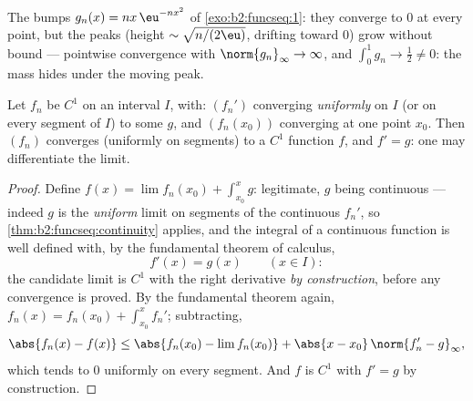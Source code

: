 \begin{omfigure}

{\small The bumps $g_n(x) = nx\,\eu^{-nx^2}$ of
\cref{exo:b2:funcseq:1}: they converge to $0$ at every point,
but the peaks (height $\sim\sqrt{n/(2\eu)}$, drifting toward
$0$) grow without bound --- pointwise convergence with
$\norm{g_n}_\infty \to \infty$, and $\int_0^1 g_n \to \frac12
\neq 0$: the mass hides under the moving peak.}
\end{omfigure}

\begin{theorem}[Differentiation]\label{thm:b2:funcseq:differentiation}
Let $f_n$ be $C^1$ on an interval $I$, with: $(f_n')$ converging
\emph{uniformly} on $I$ (or on every segment of $I$) to some $g$,
and $(f_n(x_0))$ converging at one point $x_0$. Then $(f_n)$
converges (uniformly on segments) to a $C^1$ function $f$, and $f'
= g$: one may differentiate the limit.
\end{theorem}

\begin{proof}
Define $f(x) = \lim f_n(x_0) + \int_{x_0}^x g$: legitimate, $g$
being continuous --- indeed $g$ is the \emph{uniform} limit on
segments of the continuous $f_n'$, so
\cref{thm:b2:funcseq:continuity} applies, and the integral of
a continuous function is well defined with, by the fundamental
theorem of calculus,
\[
f'(x) = g(x) \qquad (x \in I) :
\]
the candidate limit is $C^1$ with the right derivative
\emph{by construction}, before any convergence is proved. By
the fundamental theorem again, $f_n(x) = f_n(x_0) + \int_{x_0}^x
f_n'$; subtracting,
\[
\abs{f_n(x) - f(x)} \leq \abs{f_n(x_0) - \lim f_n(x_0)}
+ \abs{x - x_0}\,\norm{f_n' - g}_{\infty} ,
\]
which tends to $0$ uniformly on every segment. And $f$ is $C^1$
with $f' = g$ by construction.
\end{proof}

